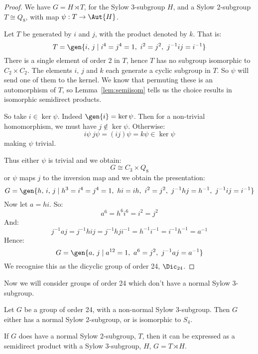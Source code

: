\begin{proof}
    We have \(G = H \rtimes T\), for the Sylow 3-subgroup \(H\), and a Sylow 2-subgroup \(T \cong Q_8\), with map
    \(\psi:T \to \Aut{H}\).

    Let \(T\) be generated by \(i\) and \(j\), with the product denoted by \(k\).
    That is:
    \[T = \gen{i,\,j \mid i^4 = j^4 = 1,\ i^2 = j^2,\ j^{-1}ij = i^{-1}}\]
    There is a single element of order 2 in \(T\), hence \(T\) has no subgroup isomorphic to \(C_2 \times C_2\).
    The elements \(i,\,j\) and \(k\) each generate a cyclic subgroup in \(T\).
    So \(\psi\) will send one of them to the kernel.
    We know that permuting these is an automorphism of \(T\), so Lemma~\ref{lem:semiisom} tells us the choice
    results in isomorphic semidirect products.

    So take \(i \in \ker{\psi}\).
    Indeed \(\gen{i} = \ker\psi\).
    Then for a non-trivial homomorphism, we must have \(j \notin \ker{\psi}\).
    Otherwise:
    \[i\psi\ j\psi = (ij)\psi = k\psi \in \ker{\psi}\]
    making \(\psi\) trivial.

    Thus either \(\psi\) is trivial and we obtain:
    \[G \cong C_3 \times Q_8\]
    or \(\psi\) maps \(j\) to the inversion map and we obtain the presentation:
    \[G = \gen{h,\,i,\,j \mid h^3 = i^4 = j^4 = 1,\ hi = ih,\ i^2 = j^2,\ j^{-1}hj = h^{-1},\ j^{-1}ij = i^{-1}}\]
    Now let \(a = hi\).
    So:
    \[a^6 = h^6 i^6 = i^2 = j^2\]
    And:
    \[j^{-1}aj = j^{-1}hij = j^{-1}hji^{-1} = h^{-1}i^{-1} = i^{-1}h^{-1} = a^{-1}\]
    Hence:
    \[G = \gen{a,\,j \mid a^{12} = 1,\ a^6 = j^2,\ j^{-1}aj = a^{-1}}\]
    We recognise this as the dicyclic group of order 24, \(\Dic_{24}\).
\end{proof}

Now we will consider groups of order 24 which don't have a normal Sylow 3-subgroup.

\begin{lemma}\label{lem:order_24_2_subgroup}
    Let \(G\) be a group of order 24, with a non-normal Sylow 3-subgroup.
    Then \(G\) either has a normal Sylow 2-subgroup, or is isomorphic to \(S_{4}\).

    If \(G\) does have a normal Sylow 2-subgroup, \(T\), then it can be expressed as a semidirect product with a Sylow
    3-subgroup, \(H\), \(G = T \rtimes H\).
\end{lemma}

